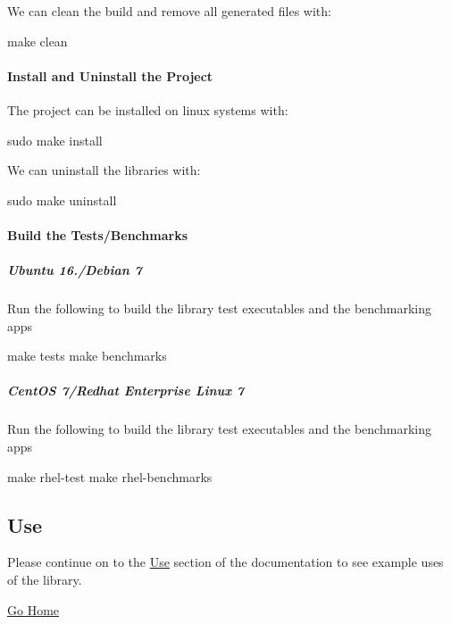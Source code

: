 We can clean the build and remove all generated files with\+: \begin{DoxyVerb}make clean
\end{DoxyVerb}


\paragraph*{Install and Uninstall the Project}

The project can be installed on linux systems with\+: \begin{DoxyVerb}sudo make install
\end{DoxyVerb}


We can uninstall the libraries with\+: \begin{DoxyVerb}sudo make uninstall
\end{DoxyVerb}


\paragraph*{Build the Tests/\+Benchmarks}

\subparagraph*{Ubuntu 16./\+Debian 7}

Run the following to build the library test executables and the benchmarking apps \begin{DoxyVerb}make tests
make benchmarks
\end{DoxyVerb}


\subparagraph*{Cent\+OS 7/\+Redhat Enterprise Linux 7}

Run the following to build the library test executables and the benchmarking apps \begin{DoxyVerb}make rhel-test
make rhel-benchmarks
\end{DoxyVerb}


\subsection*{Use}

Please continue on to the \hyperlink{use_index}{Use} section of the documentation to see example uses of the library.

\hyperlink{index}{Go Home} 